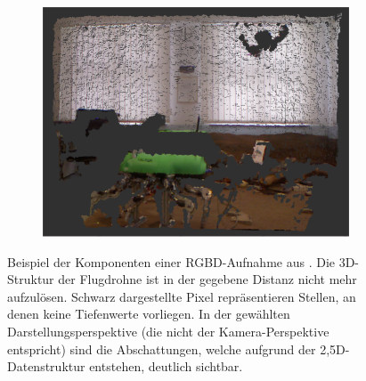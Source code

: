 \begin{figure}[htbp]
\begin{subfigure}[t]{0.31\textwidth}
	\end{subfigure}
	\begin{subfigure}[t]{0.31\textwidth}
		\includegraphics[width=\textwidth]{04_images/motion_prediction/rgbd_example_cloud}
	\end{subfigure}
	
	\caption[Beispiel der Komponenten einer RGBD-Aufnahme]{Beispiel der Komponenten einer RGBD-Aufnahme aus . Die 3D-Struktur der Flugdrohne ist in der gegebene Distanz nicht mehr aufzulösen. Schwarz dargestellte Pixel repräsentieren Stellen, an denen keine Tiefenwerte vorliegen. In der gewählten Darstellungsperspektive (die nicht der Kamera-Perspektive entspricht) sind die Abschattungen, 
		welche aufgrund der 2,5D-Datenstruktur entstehen, deutlich sichtbar.}
	\label{fig:rgbd_component_example}
\end{figure}


